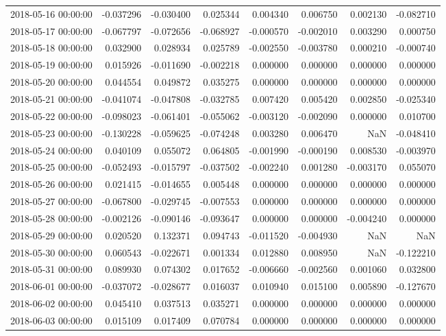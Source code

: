 \begin{tabular}{lrrrrrrr}
2018-05-16 00:00:00 & -0.037296 & -0.030400 & 0.025344 & 0.004340 & 0.006750 & 0.002130 & -0.082710 \\
2018-05-17 00:00:00 & -0.067797 & -0.072656 & -0.068927 & -0.000570 & -0.002010 & 0.003290 & 0.000750 \\
2018-05-18 00:00:00 & 0.032900 & 0.028934 & 0.025789 & -0.002550 & -0.003780 & 0.000210 & -0.000740 \\
2018-05-19 00:00:00 & 0.015926 & -0.011690 & -0.002218 & 0.000000 & 0.000000 & 0.000000 & 0.000000 \\
2018-05-20 00:00:00 & 0.044554 & 0.049872 & 0.035275 & 0.000000 & 0.000000 & 0.000000 & 0.000000 \\
2018-05-21 00:00:00 & -0.041074 & -0.047808 & -0.032785 & 0.007420 & 0.005420 & 0.002850 & -0.025340 \\
2018-05-22 00:00:00 & -0.098023 & -0.061401 & -0.055062 & -0.003120 & -0.002090 & 0.000000 & 0.010700 \\
2018-05-23 00:00:00 & -0.130228 & -0.059625 & -0.074248 & 0.003280 & 0.006470 & NaN & -0.048410 \\
2018-05-24 00:00:00 & 0.040109 & 0.055072 & 0.064805 & -0.001990 & -0.000190 & 0.008530 & -0.003970 \\
2018-05-25 00:00:00 & -0.052493 & -0.015797 & -0.037502 & -0.002240 & 0.001280 & -0.003170 & 0.055070 \\
2018-05-26 00:00:00 & 0.021415 & -0.014655 & 0.005448 & 0.000000 & 0.000000 & 0.000000 & 0.000000 \\
2018-05-27 00:00:00 & -0.067800 & -0.029745 & -0.007553 & 0.000000 & 0.000000 & 0.000000 & 0.000000 \\
2018-05-28 00:00:00 & -0.002126 & -0.090146 & -0.093647 & 0.000000 & 0.000000 & -0.004240 & 0.000000 \\
2018-05-29 00:00:00 & 0.020520 & 0.132371 & 0.094743 & -0.011520 & -0.004930 & NaN & NaN \\
2018-05-30 00:00:00 & 0.060543 & -0.022671 & 0.001334 & 0.012880 & 0.008950 & NaN & -0.122210 \\
2018-05-31 00:00:00 & 0.089930 & 0.074302 & 0.017652 & -0.006660 & -0.002560 & 0.001060 & 0.032800 \\
2018-06-01 00:00:00 & -0.037072 & -0.028677 & 0.016037 & 0.010940 & 0.015100 & 0.005890 & -0.127670 \\
2018-06-02 00:00:00 & 0.045410 & 0.037513 & 0.035271 & 0.000000 & 0.000000 & 0.000000 & 0.000000 \\
2018-06-03 00:00:00 & 0.015109 & 0.017409 & 0.070784 & 0.000000 & 0.000000 & 0.000000 & 0.000000 \\

\end{tabular}
